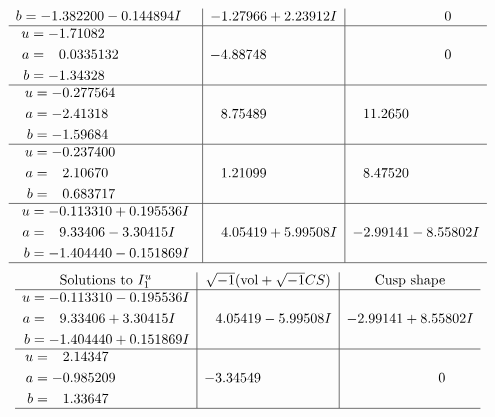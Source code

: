 \documentclass[1p]{elsarticle_modified}
\theoremstyle{definition}
\newcommand{\I}{\sqrt{-1}}
\begin{document}
$$\begin{array}{c|c|c}
\begin{aligned}
b &= -1.382200 - 0.144894 I\end{aligned}
 & -1.27966 + 2.23912 I & \phantom{-0.000000 } 0 \\ \hline\begin{aligned}
u &= -1.71082\phantom{ +0.000000I} \\
a &= \phantom{-}0.0335132\phantom{ +0.000000I} \\
b &= -1.34328\phantom{ +0.000000I}\end{aligned}
 & -4.88748\phantom{ +0.000000I} & \phantom{-0.000000 } 0 \\ \hline\begin{aligned}
u &= -0.277564\phantom{ +0.000000I} \\
a &= -2.41318\phantom{ +0.000000I} \\
b &= -1.59684\phantom{ +0.000000I}\end{aligned}
 & \phantom{-}8.75489\phantom{ +0.000000I} & \phantom{-}11.2650\phantom{ +0.000000I} \\ \hline\begin{aligned}
u &= -0.237400\phantom{ +0.000000I} \\
a &= \phantom{-}2.10670\phantom{ +0.000000I} \\
b &= \phantom{-}0.683717\phantom{ +0.000000I}\end{aligned}
 & \phantom{-}1.21099\phantom{ +0.000000I} & \phantom{-}8.47520\phantom{ +0.000000I} \\ \hline\begin{aligned}
u &= -0.113310 + 0.195536 I \\
a &= \phantom{-}9.33406 - 3.30415 I \\
b &= -1.404440 - 0.151869 I\end{aligned}
 & \phantom{-}4.05419 + 5.99508 I & -2.99141 - 8.55802 I\\
 \hline 
 \end{array}$$\newpage$$\begin{array}{c|c|c}  
\text{Solutions to }I^u_{1}& \I (\text{vol} + \sqrt{-1}CS) & \text{Cusp shape}\\
 \hline 
\begin{aligned}
u &= -0.113310 - 0.195536 I \\
a &= \phantom{-}9.33406 + 3.30415 I \\
b &= -1.404440 + 0.151869 I\end{aligned}
 & \phantom{-}4.05419 - 5.99508 I & -2.99141 + 8.55802 I \\ \hline\begin{aligned}
u &= \phantom{-}2.14347\phantom{ +0.000000I} \\
a &= -0.985209\phantom{ +0.000000I} \\
b &= \phantom{-}1.33647\phantom{ +0.000000I}\end{aligned}
 & -3.34549\phantom{ +0.000000I} & \phantom{-0.000000 } 0\\
 \hline 
 \end{array}$$\newpage\newpage\renewcommand{\arraystretch}{1}
\end{document}
